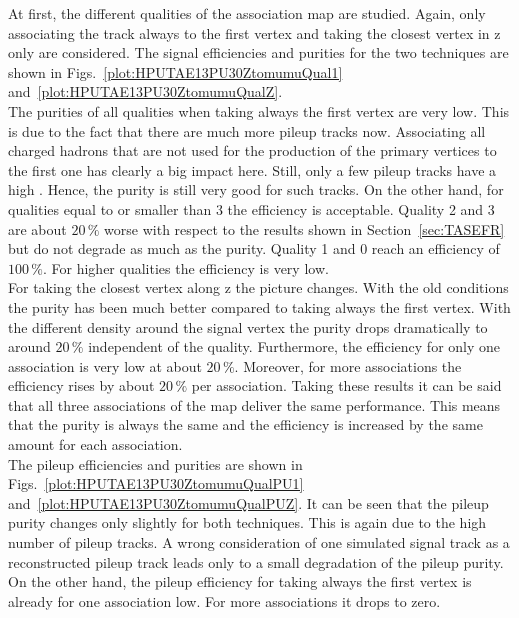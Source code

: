 At first, the different qualities of the association map are studied. Again, only associating the track always to the first vertex and taking the closest vertex in z only are considered. The signal efficiencies and purities for the two techniques are shown in Figs.~\ref{plot:HPUTAE13PU30ZtomumuQual1} and~\ref{plot:HPUTAE13PU30ZtomumuQualZ}. \\
The purities of all qualities when taking always the first vertex are very low. This is due to the fact that there are much more pileup tracks now. Associating all charged hadrons that are not used for the production of the primary vertices to the first one has clearly a big impact here. Still, only a few pileup tracks have a high \pt{}. Hence, the purity is still very good for such tracks. On the other hand, for qualities equal to or smaller than 3 the efficiency is acceptable. Quality 2 and 3  are about $20\,\%$ worse with respect to the results shown in Section~\ref{sec:TASEFR} but do not degrade as much as the purity. Quality 1 and 0 reach an efficiency of $100\,\%$. For higher qualities the efficiency is very low. \\
For taking the closest vertex along z the picture changes. With the old conditions the purity has been much better compared to taking always the first vertex. With the different density around the signal vertex the purity drops dramatically to around $20\,\%$ independent of the quality. Furthermore, the efficiency for only one association is very low at about $20\,\%$. Moreover, for more associations the efficiency rises by about $20\,\%$ per association. Taking these results it can be said that all three associations of the map deliver the same performance. This means that the purity is always the same and the efficiency is increased by the same amount for each association. \\
The pileup efficiencies and purities are shown in Figs.~\ref{plot:HPUTAE13PU30ZtomumuQualPU1} and~\ref{plot:HPUTAE13PU30ZtomumuQualPUZ}. It can be seen that the pileup purity changes only slightly for both techniques. This is again due to the high number of pileup tracks. A wrong consideration of one simulated signal track as a reconstructed pileup track leads only to a small degradation of the pileup purity. On the other hand, the pileup efficiency for taking always the first vertex is already for one association low. For more associations it drops to zero. \\
